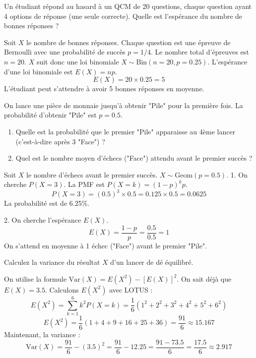 \begin{exercicebox}
Un étudiant répond au hasard à un QCM de 20 questions, chaque question ayant 4 options de réponse (une seule correcte). Quelle est l'espérance du nombre de bonnes réponses ?
\end{exercicebox}

\begin{correctionbox}
Soit $X$ le nombre de bonnes réponses. Chaque question est une épreuve de Bernoulli avec une probabilité de succès $p=1/4$. Le nombre total d'épreuves est $n=20$.
$X$ suit donc une loi binomiale $X \sim \text{Bin}(n=20, p=0.25)$.
L'espérance d'une loi binomiale est $E(X) = np$.
$$ E(X) = 20 \times 0.25 = 5 $$
L'étudiant peut s'attendre à avoir 5 bonnes réponses en moyenne.
\end{correctionbox}

\begin{exercicebox}
On lance une pièce de monnaie jusqu'à obtenir "Pile" pour la première fois. La probabilité d'obtenir "Pile" est $p=0.5$.
\begin{enumerate}
    \item Quelle est la probabilité que le premier "Pile" apparaisse au 4ème lancer (c'est-à-dire après 3 "Face") ?
    \item Quel est le nombre moyen d'échecs ("Face") attendu avant le premier succès ?
\end{enumerate}
\end{exercicebox}

\begin{correctionbox}
Soit $X$ le nombre d'échecs avant le premier succès. $X \sim \text{Geom}(p=0.5)$.
1. On cherche $P(X=3)$. La PMF est $P(X=k) = (1-p)^k p$.
$$ P(X=3) = (0.5)^3 \times 0.5 = 0.125 \times 0.5 = 0.0625 $$
La probabilité est de 6.25\%.

2. On cherche l'espérance $E(X)$.
$$ E(X) = \frac{1-p}{p} = \frac{0.5}{0.5} = 1 $$
On s'attend en moyenne à 1 échec ("Face") avant le premier "Pile".
\end{correctionbox}

\begin{exercicebox}[Variance d'un dé]
Calculez la variance du résultat $X$ d'un lancer de dé équilibré.
\end{exercicebox}

\begin{correctionbox}
On utilise la formule $\text{Var}(X) = E(X^2) - [E(X)]^2$.
On sait déjà que $E(X)=3.5$.
Calculons $E(X^2)$ avec LOTUS :
$$ E(X^2) = \sum_{k=1}^6 k^2 P(X=k) = \frac{1}{6}(1^2+2^2+3^2+4^2+5^2+6^2) $$
$$ E(X^2) = \frac{1}{6}(1+4+9+16+25+36) = \frac{91}{6} \approx 15.167 $$
Maintenant, la variance :
$$ \text{Var}(X) = \frac{91}{6} - (3.5)^2 = \frac{91}{6} - 12.25 = \frac{91 - 73.5}{6} = \frac{17.5}{6} \approx 2.917 $$
\end{correctionbox}

